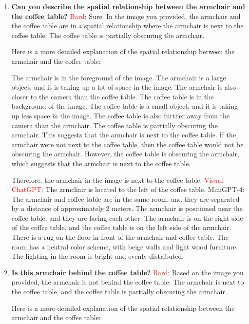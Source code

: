 \begin{enumerate}
    \item \textbf{Can you describe the spatial relationship between the armchair and the coffee table?}
    \subitem \textcolor{Red}{Bard}: 
    Sure. In the image you provided, the armchair and the coffee table are in a spatial relationship where the armchair is next to the coffee table. The coffee table is partially obscuring the armchair.
    
    Here is a more detailed explanation of the spatial relationship between the armchair and the coffee table:
    
    The armchair is in the foreground of the image. The armchair is a large object, and it is taking up a lot of space in the image. The armchair is also closer to the camera than the coffee table.
    The coffee table is in the background of the image. The coffee table is a small object, and it is taking up less space in the image. The coffee table is also further away from the camera than the armchair.
    The coffee table is partially obscuring the armchair. This suggests that the armchair is next to the coffee table.
    If the armchair were not next to the coffee table, then the coffee table would not be obscuring the armchair. However, the coffee table is obscuring the armchair, which suggests that the armchair is next to the coffee table.
    
    Therefore, the armchair in the image is next to the coffee table.
    \subitem \textcolor{red}{Visual ChatGPT}: The armchair is located to the left of the coffee table.
    \subitem MiniGPT-4: The armchair and coffee table are in the same room, and they are separated by a distance of approximately 2 meters. The armchair is positioned near the coffee table, and they are facing each other. The armchair is on the right side of the coffee table, and the coffee table is on the left side of the armchair. There is a rug on the floor in front of the armchair and coffee table. The room has a neutral color scheme, with beige walls and light wood furniture. The lighting in the room is bright and evenly distributed.
    \item \textbf{Is this armchair behind the coffee table?}
    \subitem \textcolor{Red}{Bard}: Based on the image you provided, the armchair is not behind the coffee table. The armchair is next to the coffee table, and the coffee table is partially obscuring the armchair.

    Here is a more detailed explanation of the spatial relationship between the armchair and the coffee table:
    

\end{enumerate}
